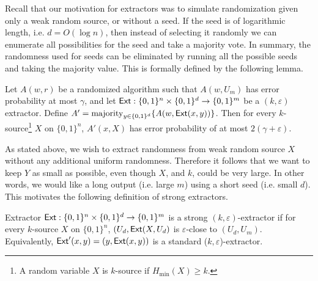 Recall that our motivation for extractors was to simulate randomization given only a weak random source, or without a seed. If the seed is of logarithmic length, i.e. $d=O(\log n)$, then instead of selecting it randomly we can enumerate all possibilities for the seed and take a majority vote. In summary, the randomness used for seeds can be eliminated by running all the possible seeds and taking the majority value. This is formally defined by the following lemma. 

\begin{lemma}
    Let $A(w,r)$ be a randomized algorithm such that $A(w,U_m)$ has error probability at most $\gamma$, and let $\mathsf{Ext}:\{0,1\}^n \times \{0,1\}^d \rightarrow \{0,1\}^m$ be a $(k,\varepsilon)$ extractor. Define $A' = {\rm majority}_{y \in \{0,1\}^d} \{A(w, \mathsf{Ext}(x,y))\}$. Then for every $k$-source\footnote{A random variable $X$ is $k$-source if $H_{\min}(X) \geq k$.} $X$ on $\{0, 1\}^n$, $A'(x, X)$ has error probability of at most $2(\gamma + \varepsilon)$.
\end{lemma}

As stated above, we wish to extract randomness from weak random source $X$ without any additional uniform randomness. Therefore it follows that we want to keep $Y$ as small as possible, even though $X$, and $k$, could be very large. In other words, we would like a long output (i.e. large $m$) using a short seed (i.e. small $d$). This motivates the following definition of strong extractors. 

\begin{definition}
    Extractor $\mathsf{Ext} : \{0, 1\}^n \times \{0, 1\}^d \rightarrow \{0,1\}^m$ is a strong $(k, \varepsilon)$-extractor if for every $k$-source $X$ on $\{0,1\}^n$, $(U_d, \mathsf{Ext}(X,U_d)$ is $\varepsilon$-close to $(U_d, U_m)$. Equivalently, $\mathsf{Ext}'(x,y) = (y, \mathsf{Ext}(x,y))$ is a standard ($k, \varepsilon$)-extractor.
\end{definition}

